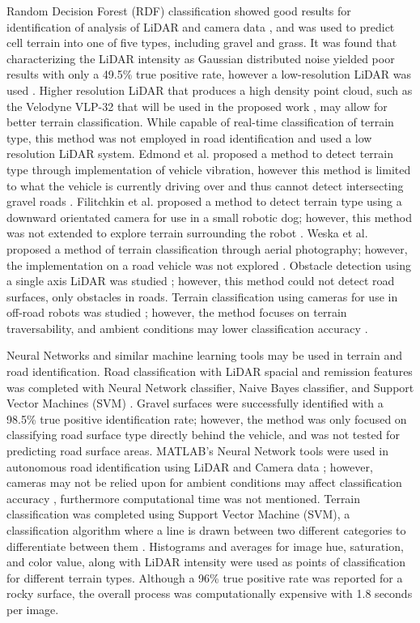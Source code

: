 \documentclass[journal,onecolumn]{IEEEtran}
\begin{document}
	{Random Decision Forest (RDF) classification showed good results for identification of analysis of LiDAR and camera data \cite{breiman_random_2001}, and was used to predict cell terrain into one of five types, including gravel and grass. It was found that characterizing the LiDAR intensity as Gaussian distributed noise yielded poor results with only a 49.5\% true positive rate, however a low-resolution LiDAR was used \cite{rauscher_comparison_2016}. Higher resolution LiDAR that produces a high density point cloud, such as the Velodyne VLP-32 that will be used in the proposed work \cite{vlp_32c}, may allow for better terrain classification. While capable of real-time classification of terrain type, this method was not employed in road identification and used a low resolution LiDAR system. Edmond et al. proposed a method to detect terrain type through implementation of vehicle vibration, however this method is limited to what the vehicle is currently driving over and thus cannot detect intersecting gravel roads \cite{dupont_online_2008}. Filitchkin et al. proposed a method to detect terrain type using a downward orientated camera for use in a small robotic dog; however, this method was not extended to explore terrain surrounding the robot \cite{filitchkin_feature_based_2012}. Weska et al. proposed a method of terrain classification through aerial photography; however, the implementation on a road vehicle was not explored \cite{weszka_comparative_1976}. Obstacle detection using a single axis LiDAR was studied \cite{manduchi_obstacle_2005}; however, this method could not detect road surfaces, only obstacles in roads. Terrain classification using cameras for use in off-road robots was studied \cite{walch_offroad_2022}; however, the method focuses on terrain traversability, and ambient conditions may lower classification accuracy \cite{levi_3d_2012_light}. }
	
	{Neural Networks and similar machine learning tools may be used in terrain and road identification. Road classification with LiDAR spacial and remission features was completed with Neural Network classifier, Naive Bayes classifier, and Support Vector Machines (SVM) \cite{wang_road_nodate,wang_two-stage_2018}. Gravel surfaces were successfully identified with a 98.5\% true positive identification rate; however, the method was only focused on classifying road surface type directly behind the vehicle, and was not tested for predicting road surface areas. MATLAB's Neural Network tools were used in autonomous road identification using LiDAR and Camera data \cite{rasmussen_combining_2002}; however, cameras may not be relied upon for ambient conditions may affect classification accuracy \cite{levi_3d_2012_light}, furthermore computational time was not mentioned. Terrain classification was completed using Support Vector Machine (SVM), a classification algorithm where a line is drawn between two different categories to differentiate between them \cite{breiman_random_2001}. Histograms and averages for image hue, saturation, and color value, along with LiDAR intensity were used as points of classification for different terrain types. Although a 96\% true positive rate was reported for a rocky surface, the overall process was computationally expensive with 1.8 seconds per image.}
	
\end{document}

